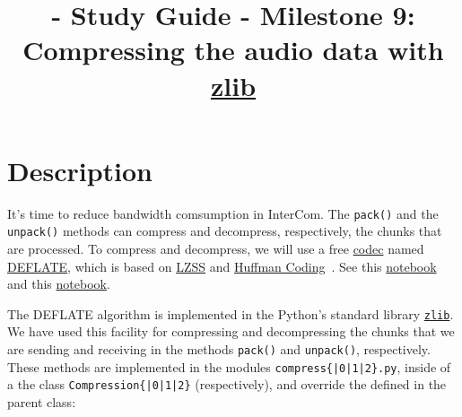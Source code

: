 
\title{\TM{} - Study Guide - Milestone 9: Compressing the audio data with \href{https://zlib.net/}{zlib}}

\maketitle

\section{Description}

It's time to reduce bandwidth comsumption in InterCom. The
\verb|pack()| and the \verb|unpack()| methods can compress and
decompress, respectively, the chunks that are processed. To compress
and decompress, we will use a free
\href{https://en.wikipedia.org/wiki/Codec}{codec} named
\href{https://en.wikipedia.org/wiki/DEFLATE}{DEFLATE}, which is based
on
\href{https://en.wikipedia.org/wiki/Lempel%E2%80%93Ziv%E2%80%93Storer%E2%80%93Szymanski}{LZSS}
  and \href{https://en.wikipedia.org/wiki/Huffman_coding}{Huffman
    Coding}~\cite{nelson96datacompression}. See this
  \href{https://github.com/vicente-gonzalez-ruiz/LZ77}{notebook} and
  this
  \href{https://vicente-gonzalez-ruiz.github.io/Huffman_coding/}{notebook}.

The DEFLATE algorithm is implemented in the Python's standard library
\href{https://docs.python.org/3/library/zlib.html}{\texttt{zlib}}. We
have used this facility for compressing and decompressing the chunks
that we are sending and receiving in the methods \verb|pack()| and
\verb|unpack()|, respectively. These methods are implemented in the
modules \texttt{compress\{|0|1|2\}.py}, inside of a the class
\texttt{Compression\{|0|1|2\}} (respectively), and
override the defined in the parent class:

